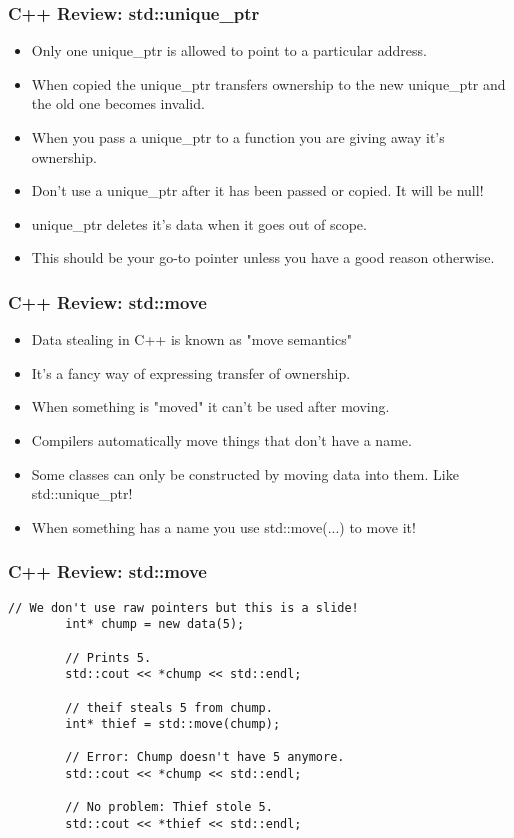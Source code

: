 \documentclass{beamer}
\begin{document}
\begin{frame}
	\frametitle{C++ Review: std::unique\_ptr}
	\begin{itemize}
		\item Only one unique\_ptr is allowed to point to a particular address.
		\item When copied the unique\_ptr transfers ownership to the new unique\_ptr and the old one becomes invalid.
		\item When you pass a unique\_ptr to a function you are giving away it's ownership.
		\item Don't use a unique\_ptr after it has been passed or copied. It will be null!
		\item unique\_ptr deletes it's data when it goes out of scope. 
		\item This should be your go-to pointer unless you have a good reason otherwise.
	\end{itemize}
\end{frame}

\begin{frame}
	\frametitle{C++ Review: std::move}
	\begin{itemize}
		\item Data stealing in C++ is known as "move semantics"
		\item It's a fancy way of expressing transfer of ownership.
		\item When something is "moved" it can't be used after moving.
		\item Compilers automatically move things that don't have a name.
		\item Some classes can only be constructed by moving data into them. Like std::unique\_ptr!
		\item When something has a name you use std::move(...) to move it!
	\end{itemize}
\end{frame}

\begin{frame}[fragile]
	\frametitle{C++ Review: std::move}
	\begin{lstlisting}[language=nuclear]
		// We don't use raw pointers but this is a slide!
		int* chump = new data(5);

		// Prints 5.
		std::cout << *chump << std::endl;

		// theif steals 5 from chump.
		int* thief = std::move(chump);

		// Error: Chump doesn't have 5 anymore.
		std::cout << *chump << std::endl;

		// No problem: Thief stole 5.
		std::cout << *thief << std::endl;
	\end{lstlisting}
\end{frame}
\end{document}
